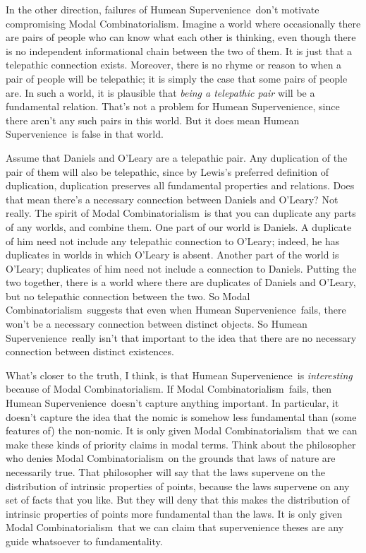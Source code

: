 \documentclass[
  11pt,
  letterpaper,
  DIV=11,
  numbers=noendperiod,
  twoside]{scrartcl}
\begin{document}
In the other direction, failures of Humean Supervenience~don't motivate
compromising Modal Combinatorialism. Imagine a world where occasionally
there are pairs of people who can know what each other is thinking, even
though there is no independent informational chain between the two of
them. It is just that a telepathic connection exists. Moreover, there is
no rhyme or reason to when a pair of people will be telepathic; it is
simply the case that some pairs of people are. In such a world, it is
plausible that \emph{being a telepathic pair} will be a fundamental
relation. That's not a problem for Humean Supervenience, since there
aren't any such pairs in this world. But it does mean Humean
Supervenience~is false in that world.

Assume that Daniels and O'Leary are a telepathic pair. Any duplication
of the pair of them will also be telepathic, since by Lewis's preferred
definition of duplication, duplication preserves all fundamental
properties and relations. Does that mean there's a necessary connection
between Daniels and O'Leary? Not really. The spirit of Modal
Combinatorialism~is that you can duplicate any parts of any worlds, and
combine them. One part of our world is Daniels. A duplicate of him need
not include any telepathic connection to O'Leary; indeed, he has
duplicates in worlds in which O'Leary is absent. Another part of the
world is O'Leary; duplicates of him need not include a connection to
Daniels. Putting the two together, there is a world where there are
duplicates of Daniels and O'Leary, but no telepathic connection between
the two. So Modal Combinatorialism~suggests that even when Humean
Supervenience~fails, there won't be a necessary connection between
distinct objects. So Humean Supervenience~really isn't that important to
the idea that there are no necessary connection between distinct
existences.

What's closer to the truth, I think, is that Humean Supervenience~is
\emph{interesting} because of Modal Combinatorialism. If Modal
Combinatorialism~fails, then Humean Supervenience~doesn't capture
anything important. In particular, it doesn't capture the idea that the
nomic is somehow less fundamental than (some features of) the non-nomic.
It is only given Modal Combinatorialism~that we can make these kinds of
priority claims in modal terms. Think about the philosopher who denies
Modal Combinatorialism~on the grounds that laws of nature are
necessarily true. That philosopher will say that the laws supervene on
the distribution of intrinsic properties of points, because the laws
supervene on any set of facts that you like. But they will deny that
this makes the distribution of intrinsic properties of points more
fundamental than the laws. It is only given Modal Combinatorialism~that
we can claim that supervenience theses are any guide whatsoever to
fundamentality.
\end{document}
